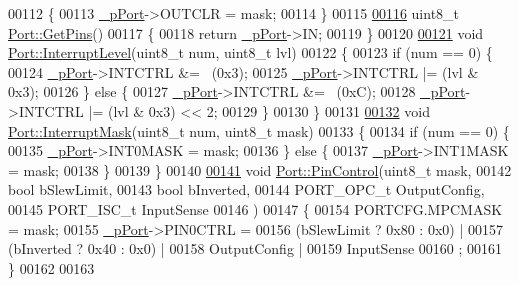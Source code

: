 \begin{DoxyCode}
00112 \{
00113     \hyperlink{class_port_a1475caa8ec2e667350eae96d4b7a28ac}{_pPort}->OUTCLR = mask;
00114 \}
00115 
\hypertarget{_port_8cpp_source_l00116}{}\hyperlink{class_port_ab13ab1f58e8f17fec681e38872ac56d9}{00116} uint8\_t \hyperlink{class_port_ab13ab1f58e8f17fec681e38872ac56d9}{Port::GetPins}()
00117 \{
00118     \textcolor{keywordflow}{return} \hyperlink{class_port_a1475caa8ec2e667350eae96d4b7a28ac}{_pPort}->IN;
00119 \}
00120 
\hypertarget{_port_8cpp_source_l00121}{}\hyperlink{class_port_ae43736d7fff93b93d1d1dac27df64591}{00121} \textcolor{keywordtype}{void} \hyperlink{class_port_ae43736d7fff93b93d1d1dac27df64591}{Port::InterruptLevel}(uint8\_t num, uint8\_t lvl)
00122 \{
00123     \textcolor{keywordflow}{if} (num == 0) \{
00124         \hyperlink{class_port_a1475caa8ec2e667350eae96d4b7a28ac}{_pPort}->INTCTRL &= ~(0x3);
00125         \hyperlink{class_port_a1475caa8ec2e667350eae96d4b7a28ac}{_pPort}->INTCTRL |= (lvl & 0x3);
00126     \} \textcolor{keywordflow}{else} \{
00127         \hyperlink{class_port_a1475caa8ec2e667350eae96d4b7a28ac}{_pPort}->INTCTRL &= ~(0xC);
00128         \hyperlink{class_port_a1475caa8ec2e667350eae96d4b7a28ac}{_pPort}->INTCTRL |= (lvl & 0x3) << 2;
00129     \}
00130 \}
00131 
\hypertarget{_port_8cpp_source_l00132}{}\hyperlink{class_port_a638be122540b191c8cb84b61d6363d28}{00132} \textcolor{keywordtype}{void} \hyperlink{class_port_a638be122540b191c8cb84b61d6363d28}{Port::InterruptMask}(uint8\_t num, uint8\_t mask)
00133 \{
00134     \textcolor{keywordflow}{if} (num == 0) \{
00135         \hyperlink{class_port_a1475caa8ec2e667350eae96d4b7a28ac}{_pPort}->INT0MASK = mask;
00136     \} \textcolor{keywordflow}{else} \{
00137         \hyperlink{class_port_a1475caa8ec2e667350eae96d4b7a28ac}{_pPort}->INT1MASK = mask;
00138     \}
00139 \}
00140 
\hypertarget{_port_8cpp_source_l00141}{}\hyperlink{class_port_ab2f2ecab7c1402a03c87d866a8cd5380}{00141} \textcolor{keywordtype}{void} \hyperlink{class_port_ab2f2ecab7c1402a03c87d866a8cd5380}{Port::PinControl}(uint8\_t mask, 
00142         \textcolor{keywordtype}{bool} bSlewLimit,
00143         \textcolor{keywordtype}{bool} bInverted,
00144         PORT\_OPC\_t OutputConfig,
00145         PORT\_ISC\_t InputSense
00146         )
00147 \{
00154     PORTCFG.MPCMASK = mask;
00155     \hyperlink{class_port_a1475caa8ec2e667350eae96d4b7a28ac}{_pPort}->PIN0CTRL = 
00156         (bSlewLimit ? 0x80 : 0x0) |
00157         (bInverted ? 0x40 : 0x0)  |
00158         OutputConfig | 
00159         InputSense
00160         ;
00161 \}
00162 
00163 
\end{DoxyCode}
